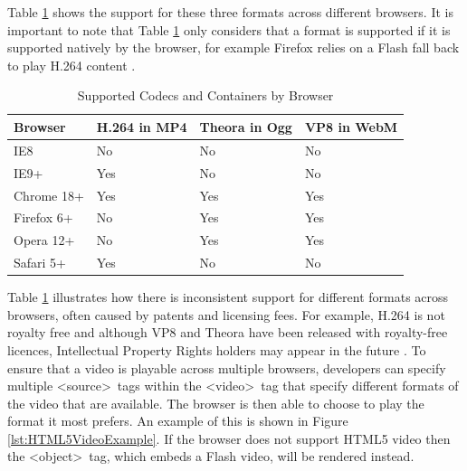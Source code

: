 \documentclass[journal]{IEEEtran}
\begin{document}
Table \ref{tab:supportedCodecsAndContainers} shows the support for these three formats across different browsers. It is important to note that Table \ref{tab:supportedCodecsAndContainers} only considers that a format is supported if it is supported natively by the browser, for example Firefox relies on a Flash fall back to play H.264 content \cite{website:firefoxVideoMobileAndTheOpenWeb}.

\begin{table}
	\caption{Supported Codecs and Containers by Browser \cite{inproceedings:applicationOfHTML5Multimedia}\cite{article:towardsVideoOnTheWebWithHTML5}}
	\label{tab:supportedCodecsAndContainers}
	\centering
  \begin{tabular}{|l|l|l|l|}
    \hline
    \textbf{Browser}    & \textbf{H.264 in MP4} & \textbf{Theora in Ogg} & \textbf{VP8 in WebM} \\ \hline
    IE8        & No           & No            & No          \\ \hline
    IE9+       & Yes          & No            & No          \\ \hline
    Chrome 18+ & Yes          & Yes           & Yes         \\ \hline
    Firefox 6+ & No           & Yes           & Yes         \\ \hline
    Opera 12+  & No           & Yes           & Yes         \\ \hline
    Safari 5+  & Yes          & No            & No          \\ \hline
  \end{tabular}
\end{table}

Table \ref{tab:supportedCodecsAndContainers} illustrates how there is inconsistent support for different formats across browsers, often caused by patents and licensing fees. For example, H.264 is not royalty free and although VP8 and Theora have been released with royalty-free licences, Intellectual Property Rights holders may appear in the future \cite{article:towardsVideoOnTheWebWithHTML5}\cite{website:theoraBenefits}. To ensure that a video is playable across multiple browsers, developers can specify multiple \textless source\textgreater~tags within the \textless video\textgreater~tag that specify different formats of the video that are available. The browser is then able to choose to play the format it most prefers. An example of this is shown in Figure \ref{lst:HTML5VideoExample}. If the browser does not support HTML5 video then the \textless object\textgreater~tag, which embeds a Flash video, will be rendered instead.
\end{document}
